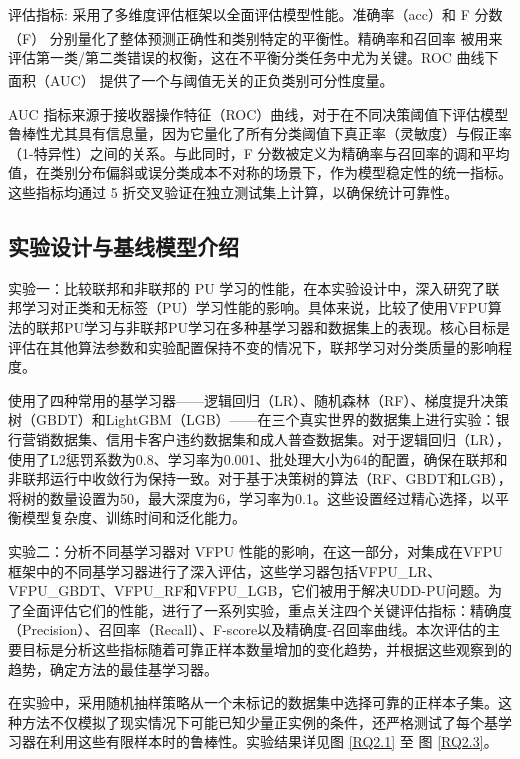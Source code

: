 评估指标:  
采用了多维度评估框架以全面评估模型性能。准确率（acc）和 F 分数（F）\textsuperscript{\cite{cheng2021secureboost}} 分别量化了整体预测正确性和类别特定的平衡性。精确率和召回率 \textsuperscript{\cite{liu2003building}} 被用来评估第一类/第二类错误的权衡，这在不平衡分类任务中尤为关键。ROC 曲线下面积（AUC）\textsuperscript{\cite{cheng2021secureboost}} 提供了一个与阈值无关的正负类别可分性度量。  

AUC 指标来源于接收器操作特征（ROC）曲线，对于在不同决策阈值下评估模型鲁棒性尤其具有信息量，因为它量化了所有分类阈值下真正率（灵敏度）与假正率（1-特异性）之间的关系。与此同时，F 分数被定义为精确率与召回率的调和平均值，在类别分布偏斜或误分类成本不对称的场景下，作为模型稳定性的统一指标。这些指标均通过 5 折交叉验证在独立测试集上计算，以确保统计可靠性。  
\subsection{实验设计与基线模型介绍}

实验一：比较联邦和非联邦的 PU 学习的性能，在本实验设计中，深入研究了联邦学习对正类和无标签（PU）学习性能的影响。具体来说，比较了使用VFPU算法的联邦PU学习与非联邦PU学习在多种基学习器和数据集上的表现。核心目标是评估在其他算法参数和实验配置保持不变的情况下，联邦学习对分类质量的影响程度。

使用了四种常用的基学习器——逻辑回归（LR）、随机森林（RF）、梯度提升决策树（GBDT）和LightGBM（LGB）——在三个真实世界的数据集上进行实验：银行营销数据集、信用卡客户违约数据集和成人普查数据集。对于逻辑回归（LR），使用了L2惩罚系数为0.8、学习率为0.001、批处理大小为64的配置，确保在联邦和非联邦运行中收敛行为保持一致。对于基于决策树的算法（RF、GBDT和LGB），将树的数量设置为50，最大深度为6，学习率为0.1。这些设置经过精心选择，以平衡模型复杂度、训练时间和泛化能力。

实验二：分析不同基学习器对 VFPU 性能的影响，在这一部分，对集成在VFPU框架中的不同基学习器进行了深入评估，这些学习器包括VFPU\_LR、VFPU\_GBDT、VFPU\_RF和VFPU\_LGB，它们被用于解决UDD-PU问题。为了全面评估它们的性能，进行了一系列实验，重点关注四个关键评估指标：精确度（Precision）、召回率（Recall）、F-score以及精确度-召回率曲线。本次评估的主要目标是分析这些指标随着可靠正样本数量增加的变化趋势，并根据这些观察到的趋势，确定方法的最佳基学习器。

在实验中，采用随机抽样策略从一个未标记的数据集中选择可靠的正样本子集。这种方法不仅模拟了现实情况下可能已知少量正实例的条件，还严格测试了每个基学习器在利用这些有限样本时的鲁棒性。实验结果详见图 \ref{RQ2.1} 至 图 \ref{RQ2.3}。

